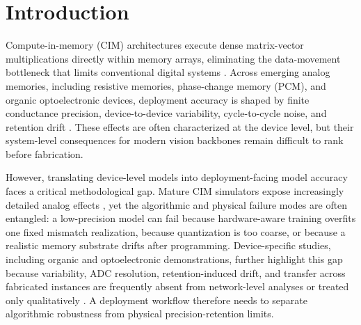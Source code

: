 \section{Introduction}
\label{sec:introduction}

Compute-in-memory (CIM) architectures execute dense matrix-vector multiplications directly within memory arrays, eliminating the data-movement bottleneck that limits conventional digital systems \citep{horowitz2014computing,peng2020dnnneurosim,lanza2025memristor}. Across emerging analog memories, including resistive memories, phase-change memory (PCM), and organic optoelectronic devices, deployment accuracy is shaped by finite conductance precision, device-to-device variability, cycle-to-cycle noise, and retention drift \citep{rasch2021aihwkit,crosssim2024,xu2025emerging,guo2024organic,photonics2025organicreview}. These effects are often characterized at the device level, but their system-level consequences for modern vision backbones remain difficult to rank before fabrication.

However, translating device-level models into deployment-facing model accuracy faces a critical methodological gap. Mature CIM simulators expose increasingly detailed analog effects \citep{peng2020dnnneurosim,lammie2022memtorch,rasch2021aihwkit,crosssim2024}, yet the algorithmic and physical failure modes are often entangled: a low-precision model can fail because hardware-aware training overfits one fixed mismatch realization, because quantization is too coarse, or because a realistic memory substrate drifts after programming. Device-specific studies, including organic and optoelectronic demonstrations, further highlight this gap because variability, ADC resolution, retention-induced drift, and transfer across fabricated instances are frequently absent from network-level analyses or treated only qualitatively \citep{zeng2023organicmemristor,jung2024organicfilaments,lin2016physical}. A deployment workflow therefore needs to separate algorithmic robustness from physical precision-retention limits.

